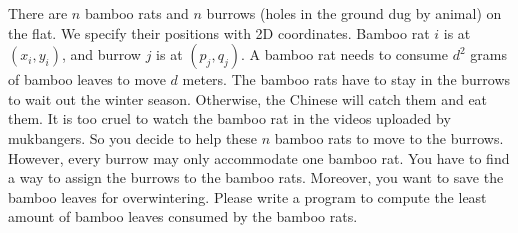 There are $n$ bamboo rats and $n$ burrows (holes in the ground dug by animal)
on the flat. We specify their positions with 2D coordinates. 
Bamboo rat $i$ is at $(x_i,y_i)$, and burrow $j$ is at $(p_j,q_j)$. 
A bamboo rat needs to consume $d^2$ grams of bamboo leaves to move $d$ meters.
The bamboo rats have to stay in the burrows to wait out the winter season.
Otherwise, the Chinese will catch them and eat them.
It is too cruel to watch the bamboo rat in the videos uploaded by mukbangers.
So you decide to help these $n$ bamboo rats to move to the burrows.
However, every burrow may only accommodate one bamboo rat.
You have to find a way to assign the burrows to the bamboo rats. 
Moreover, you want to save the bamboo leaves for overwintering.
Please write a program to compute the least amount of bamboo leaves consumed
by the bamboo rats.

